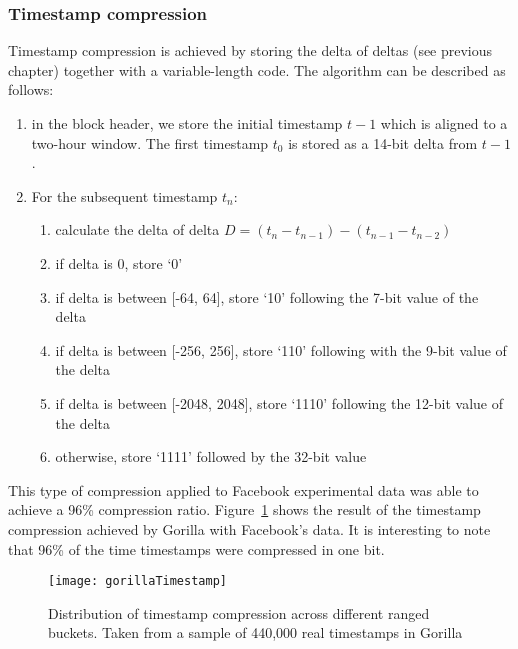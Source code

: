 \subsubsection{Timestamp compression}
Timestamp compression is achieved by storing the delta of deltas (see previous chapter)
together with a variable-length code.
The algorithm can be described as follows:
\begin{enumerate}
    \item in the block header, we store the initial timestamp $t-1$ which is aligned to a
    two-hour window. The first timestamp $t_0$ is stored as a 14-bit delta from $t-1$.
    \item For the subsequent timestamp $t_n$:
        \begin{enumerate}
            \item calculate the delta of delta $D = (t_n - t_{n-1}) - (t_{n-1} - t_{n-2})$
            \item if delta is 0, store ‘0’
            \item if delta is between [-64, 64], store ‘10’ following the 7-bit value of the
            delta
            \item if delta is between [-256, 256], store ‘110’ following with the 9-bit
            value of the delta
            \item if delta is between [-2048, 2048], store ‘1110’ following the 12-bit value
            of the delta
            \item otherwise, store ‘1111’ followed by the 32-bit value
        \end{enumerate}
\end{enumerate}
This type of compression applied to Facebook experimental data was able to achieve a 96\%
compression ratio. Figure~\ref{gorilla_timestamp} shows the result of the timestamp
compression achieved by Gorilla with Facebook’s data. It is interesting to note that
96\% of the time timestamps were compressed in one bit.

\begin{figure}[]
\begin{center}
\texttt{[image: gorillaTimestamp]}
\caption[gorilla_timestamp]{ Distribution of timestamp compression across different ranged buckets.
Taken from a sample of 440,000 real timestamps in Gorilla \cite{Pelkonen2015Gorilla}}
\label{gorilla_timestamp}
\end{center}
\end{figure}

